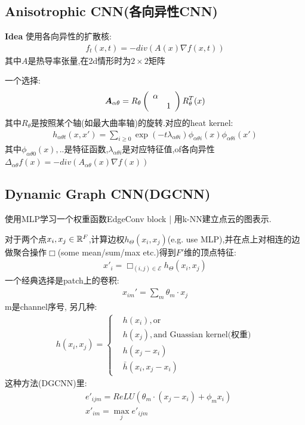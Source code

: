 \documentclass{article}
\begin{document}
\subsection{Anisotrophic CNN(各向异性CNN)}

\textbf{Idea} 使用各向异性的扩散核:
\begin{align}
    f_t(x,t)=-div(A(x)\nabla f(x,t))
\end{align}
其中$A$是热导率张量,在2d情形时为$2\times2$矩阵

一个选择:\begin{align}
    \boldsymbol{A}_{\alpha\theta}=R_\theta \left(\begin{array}{ccc}
        \alpha  &\\
           &1
    \end{array}\right)R_\theta^T(x)
\end{align}
其中$R_\theta$是按照某个轴(如最大曲率轴)的旋转.对应的heat kernel:
\begin{align}
    h_{\alpha\theta t}(x,x')=\sum_{i\geq 0}\exp(-t\lambda_{\alpha \theta i})\phi_{\alpha \theta i}(x)\phi_{\alpha \theta i}(x')
\end{align}
其中$\phi_{\alpha \theta 0}(x),..$是特征函数,$\lambda_{\alpha \theta i}$是对应特征值,of各向异性\lop$\Delta_{\alpha \theta}f(x)=-div(A_{\alpha \theta}(x)\nabla f(x))$

\subsection{Dynamic Graph CNN(DGCNN)}

 使用MLP学习一个权重函数\trarr EdgeConv block | 用k-NN建立点云的图表示.

对于两个点$x_i, x_j\in \mathbb{R}^F$,计算边权$h_\Theta(x_i,x_j)$(e.g. use MLP),并在点上对相连的边做聚合操作$\Box$(some mean/sum/max etc.)得到$F'$维的顶点特征:
\begin{align}
    x'_i=\Box_{(i,j)\in \mathcal{E}} h_\Theta(x_i,x_j)
\end{align}
一个经典选择是patch上的卷积:
\begin{align}
    x_{im}'=\sum_m \theta_m \cdot x_j
\end{align}
m是channel序号,
另几种:
\begin{align}
    h(x_i,x_j)=\begin{cases}
        &h(x_i), \text{or}\\
        &h(x_j), \text{and Guassian kernel(权重)}\\
        &h(x_j-x_i)\\
        &\bar h(x_i, x_j-x_i)
    \end{cases}
\end{align}
这种方法(DGCNN)里:
\begin{align}
    &e'_{ijm}=ReLU(\theta_m \cdot (x_j-x_i)+\phi_m x_i)\\
    &x'_{im}=\max_j e'_{ijm}
\end{align}
\end{document}
